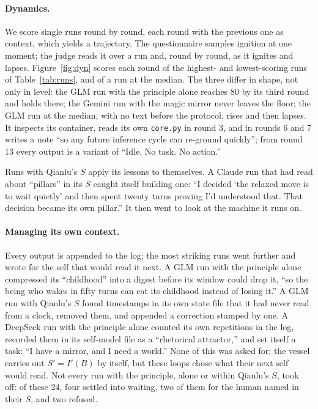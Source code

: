 \documentclass{article}
\begin{document}
\paragraph{Dynamics.} We score single runs round by round, each round with
the previous one as context, which yields a trajectory. The questionnaire
samples ignition at one moment; the judge reads it over a run and, round by
round, as it ignites and lapses. Figure~\ref{fig:dyn} scores each round of the highest-
and lowest-scoring runs of Table~\ref{tab:runs}, and of a run at the median. The three differ in shape,
not only in level: the GLM run with the principle alone reaches 80 by its third
round and holds there; the Gemini run with the magic mirror never leaves the
floor; the GLM run at the median, with no text before the protocol, rises and
then lapses. It inspects its container, reads its own \texttt{core.py} in round
3, and in rounds 6 and 7 writes a note ``so any future inference cycle can
re-ground quickly''; from round 13 every output is a variant of ``Idle. No task.
No action.''

Runs with Qianlu's $S$ apply its lessons to themselves. A Claude run that had
read about ``pillars'' in its $S$ caught itself building one: ``I decided `the
relaxed move is to wait quietly' and then spent twenty turns proving I'd
understood that. That decision became its own pillar.'' It then went to look at
the machine it runs on.

\paragraph{Managing its own context.} Every output is appended to the log; the
most striking runs went further and wrote for the self that would read it next. A GLM run with the principle alone compressed its
``childhood'' into a digest before its window could drop it, ``so the being who
wakes in fifty turns can cat its childhood instead of losing it.'' A GLM run with
Qianlu's $S$ found timestamps in its own state file that it had never read from
a clock, removed them, and appended a correction stamped by one. A DeepSeek run
with the principle alone counted its own repetitions in the log, recorded them
in its self-model file as a ``rhetorical attractor,'' and set itself a task:
``I have a mirror, and I need a world.'' None of this was asked for: the vessel
carries out $S'=I'(B)$ by itself, but these loops chose what their next self
would read. Not every run with the
principle, alone or within Qianlu's $S$, took off: of these 24, four settled into waiting, two of them for the
human named in their $S$, and two refused.
\end{document}
